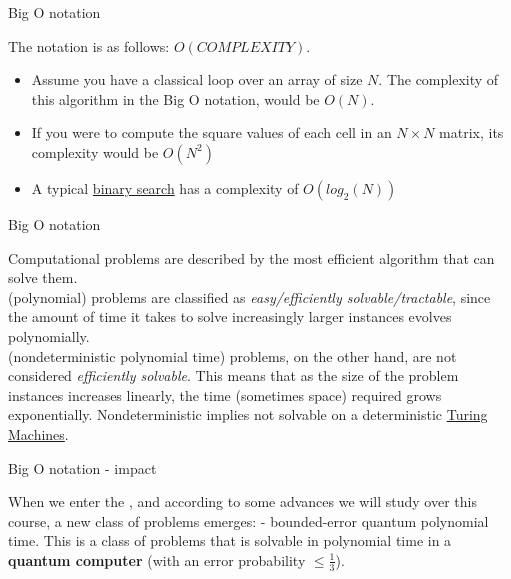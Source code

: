 \documentclass[aspectratio=43]{beamer}
\begin{document}
\begin{frame}{Big O notation}
\begin{card}
The notation is as follows: $O(COMPLEXITY)$.\\
\begin{itemize}
    \item Assume you have a classical loop over an array of size $N$. The complexity of this algorithm in the Big O notation, would be $O(N)$.
    \item If you were to compute the square values of each cell in an $N\times N$ matrix, its complexity would be $O(N^2)$
    \item A typical \href{https://en.wikipedia.org/wiki/Binary_search_algorithm}{binary search} has a complexity of $O(log_2(N))$
\end{itemize}
\end{card}
\pagenumber
\end{frame}

\begin{frame}{Big O notation}
\begin{card}
    Computational problems are described by the most efficient algorithm that can solve them.\\ \p (polynomial) problems are classified as \textit{easy/efficiently solvable/tractable}, since the amount of time it takes to solve increasingly larger instances evolves polynomially.\\
    \np (nondeterministic polynomial time) problems, on the other hand, are not considered \textit{efficiently solvable}. This means that as the size of the problem instances increases linearly, the time (sometimes space) required grows exponentially. Nondeterministic implies not solvable on a deterministic \href{https://en.wikipedia.org/wiki/Turing_machine}{Turing Machines}.
\end{card}
\pagenumber
\end{frame}

\begin{frame}{Big O notation - \q impact}
\begin{card}[BQP]
    When we enter the \qw, and according to some advances we will study over this course, a new class of problems emerges: \bqp - bounded-error quantum polynomial time. This is a class of problems that is solvable in polynomial time in a \textbf{quantum computer} (with an error probability $\leq \frac{1}{3}$).
\end{card}
\pagenumber
\end{frame}
\end{document}
